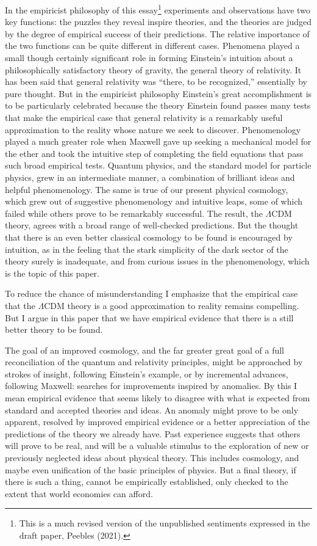 \documentclass[fleqn,12pt]{article}
\begin{document}
\noindent In the empiricist philosophy of this essay\footnote{This is a much revised version of the unpublished sentiments expressed in the draft paper, Peebles (2021).} experiments and observations have two key functions: the puzzles they reveal inspire theories, and the theories are judged by the degree of empirical success of their predictions. The relative importance of the two functions can be quite different in different cases. Phenomena  played a small though certainly significant role in forming Einstein's intuition about a philosophically satisfactory theory of gravity, the general theory of relativity. It has been said that general relativity was ``there, to be recognized,'' essentially by pure thought. But in the empiricist philosophy Einstein's great accomplishment is to be particularly celebrated because the theory Einstein found passes many tests that make the empirical case that general relativity is a remarkably useful approximation to the reality whose nature we seek to discover. Phenomenology played a much greater role when Maxwell gave up seeking a mechanical model for the ether and took the intuitive step of completing the field equations that pass such broad empirical tests. Quantum physics, and the standard model for particle physics, grew in an intermediate manner, a combination of brilliant ideas and helpful phenomenology. The same is true of our present physical cosmology, which grew out of suggestive phenomenology and intuitive leaps, some of which failed while others prove to be remarkably successful. The result, the $\Lambda$CDM theory, agrees with a broad range of well-checked predictions. But the thought that there is an even better classical cosmology to be found is encouraged by intuition, as in the feeling that the stark simplicity of the dark sector of the theory surely is inadequate, and from curious issues in the phenomenology, which is the topic of this paper. 

To reduce the chance of misunderstanding I emphasize that the empirical case that the  $\Lambda$CDM theory is a good approximation to reality remains compelling. But I argue in this paper that we have empirical evidence that there is a still better theory to be found. 

The goal of an improved cosmology, and the far greater great goal of a full reconciliation of the quantum and relativity principles, might be approached by strokes of insight, following Einstein's example, or by incremental advances, following Maxwell: searches for improvements inspired by anomalies. By this I mean empirical evidence that seems likely to disagree with what is expected from standard and accepted theories and ideas. An anomaly might prove to be only apparent, resolved by improved empirical evidence or a better appreciation of the predictions of the theory we already have. Past experience suggests that others will prove to be real, and will be a valuable stimulus to the exploration of new or previously neglected ideas about physical theory. This includes cosmology, and maybe even unification of the basic principles of physics. But a final theory, if there is such a thing, cannot be empirically established, only checked to the extent that world economies can afford. 
\end{document}
